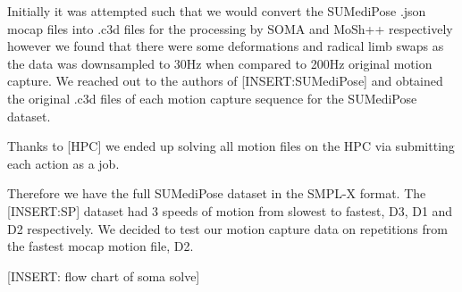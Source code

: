 Initially it was attempted such that we would convert the SUMediPose .json mocap files into .c3d files for the processing by SOMA and MoSh++ respectively however we found that there were some deformations and radical limb swaps as the data was downsampled to 30Hz when compared to 200Hz original motion capture. We reached out to the authors of [INSERT:SUMediPose] and obtained the original .c3d files of each motion capture sequence for the SUMediPose dataset. 

Thanks to [HPC] we ended up solving all motion files on the HPC via submitting each action as a job. 

Therefore we have the full SUMediPose dataset in the SMPL-X format. The [INSERT:SP] dataset had 3 speeds of motion from slowest to fastest, D3, D1 and D2 respectively.
We decided to test our motion capture data on repetitions from the fastest mocap motion file, D2.

[INSERT: flow chart of soma solve]

